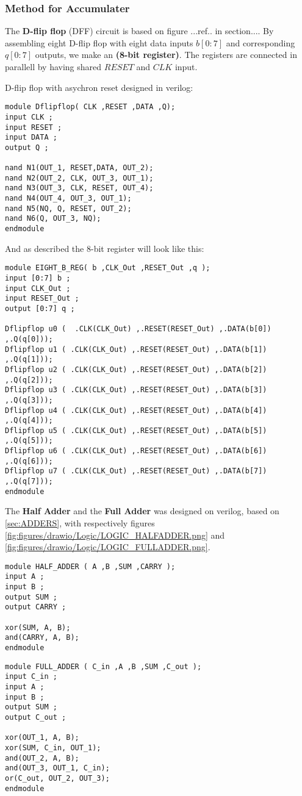 \subsubsection{Method for Accumulater}

The \textbf{D-flip flop} (DFF) circuit is based on figure ...ref.. in section.... By assembling eight D-flip flop with eight data inputs $b[0:7]$ and corresponding $q[0:7]$ outputs, we make an \textbf{(8-bit register)}. The registers are connected in parallell by having shared $RESET$ and $CLK$ input. 

D-flip flop with asychron reset designed in verilog:
\begin{lstlisting}
module Dflipflop( CLK ,RESET ,DATA ,Q);
input CLK ;
input RESET ;
input DATA ;
output Q ;

nand N1(OUT_1, RESET,DATA, OUT_2);
nand N2(OUT_2, CLK, OUT_3, OUT_1);
nand N3(OUT_3, CLK, RESET, OUT_4);
nand N4(OUT_4, OUT_3, OUT_1);
nand N5(NQ, Q, RESET, OUT_2);
nand N6(Q, OUT_3, NQ);
endmodule
\end{lstlisting}
And as described the 8-bit register will look like this:

\begin{lstlisting}
module EIGHT_B_REG( b ,CLK_Out ,RESET_Out ,q );
input [0:7] b ;
input CLK_Out ;
input RESET_Out ;
output [0:7] q ;

Dflipflop u0 (	.CLK(CLK_Out) ,.RESET(RESET_Out) ,.DATA(b[0]) ,.Q(q[0])); 
Dflipflop u1 ( .CLK(CLK_Out) ,.RESET(RESET_Out) ,.DATA(b[1]) ,.Q(q[1]));
Dflipflop u2 ( .CLK(CLK_Out) ,.RESET(RESET_Out) ,.DATA(b[2]) ,.Q(q[2]));
Dflipflop u3 ( .CLK(CLK_Out) ,.RESET(RESET_Out) ,.DATA(b[3]) ,.Q(q[3]));
Dflipflop u4 ( .CLK(CLK_Out) ,.RESET(RESET_Out) ,.DATA(b[4]) ,.Q(q[4]));
Dflipflop u5 ( .CLK(CLK_Out) ,.RESET(RESET_Out) ,.DATA(b[5]) ,.Q(q[5]));
Dflipflop u6 ( .CLK(CLK_Out) ,.RESET(RESET_Out) ,.DATA(b[6]) ,.Q(q[6]));
Dflipflop u7 ( .CLK(CLK_Out) ,.RESET(RESET_Out) ,.DATA(b[7]) ,.Q(q[7]));
endmodule
\end{lstlisting}

The \textbf{Half Adder} and the \textbf{Full Adder} was designed on verilog, based on \ref{sec:ADDERS}, with respectively figures \ref{fig:figures/drawio/Logic/LOGIC_HALFADDER.png} and \ref{fig:figures/drawio/Logic/LOGIC_FULLADDER.png}.
\begin{lstlisting}
module HALF_ADDER ( A ,B ,SUM ,CARRY );
input A ;
input B ;
output SUM ;
output CARRY ;

xor(SUM, A, B);
and(CARRY, A, B);
endmodule
\end{lstlisting}
\begin{lstlisting}
module FULL_ADDER ( C_in ,A ,B ,SUM ,C_out );
input C_in ;
input A ;
input B ;
output SUM ;
output C_out ;

xor(OUT_1, A, B);
xor(SUM, C_in, OUT_1);
and(OUT_2, A, B);
and(OUT_3, OUT_1, C_in);
or(C_out, OUT_2, OUT_3);
endmodule
\end{lstlisting}

